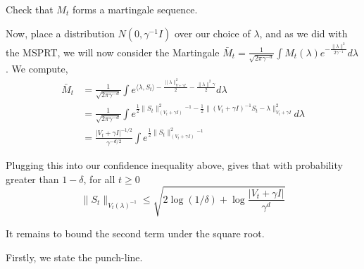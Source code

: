 \exercise Check that $M_t$ forms a martingale sequence. 

Now, place a distribution $N(0, \gamma^{-1}I)$ over our choice of $\lambda$, and as we did with the MSPRT, we will now consider the Martingale $\bar{M}_t = \frac{1}{\sqrt{2\pi\gamma^{-d}}}\int M_t(\lambda) e^{-\frac{\|\lambda\|^2}{2\gamma^{-1}}} d\lambda$. We compute,
\begin{align*}
    \bar{M}_t 
    &= \frac{1}{\sqrt{2\pi\gamma^{-d}}}\int  e^{\langle\lambda, S_t\rangle -\frac{\|\lambda\|_{V + \gamma I}^2}{2}-\frac{\|\lambda\|^2\gamma}{2}} d\lambda\\
    &= \frac{1}{\sqrt{2\pi\gamma^{-d}}}\int e^{\frac{1}{2}\|S_t\|^2_(V_t + \gamma I)^{-1} - \frac{1}{2}\|(V_t + \gamma I)^{-1} S_t - \lambda\|^2_{V_t + \gamma I}} d\lambda\\
    &= \frac{|V_t + \gamma I|^{-1/2}}{\gamma^{-d/2}}\int e^{\frac{1}{2}\|S_t\|^2_(V_t +\gamma I )^{-1}} 
\end{align*}

Plugging this into our confidence inequality above, gives that with probability greater than $1-\delta$, for all $t\geq 0$
\[\|S_t\|_{V_t(\lambda)^{-1}} \leq \sqrt{2\log(1/\delta) + \log{\frac{|V_t + \gamma I|}{\gamma^d}}}\]

It remains to bound the second term under the square root. 



Firstly, we state the punch-line.





